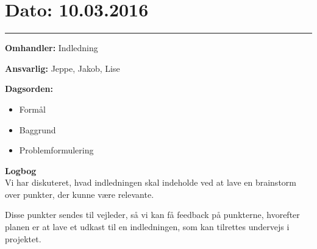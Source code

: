 \section{Dato: 10.03.2016}
\hrule

\textbf{Omhandler:} Indledning

\textbf{Ansvarlig:} Jeppe, Jakob, Lise

\textbf{Dagsorden:}
\begin{itemize}
	\item Formål
	\item Baggrund
	\item Problemformulering
\end{itemize}

\textbf{Logbog}
\\
Vi har diskuteret, hvad indledningen skal indeholde ved at lave en brainstorm over punkter, der kunne være relevante.

Disse punkter sendes til vejleder, så vi kan få feedback på punkterne, hvorefter planen er at lave et udkast til en indledningen, som kan tilrettes undervejs i projektet.